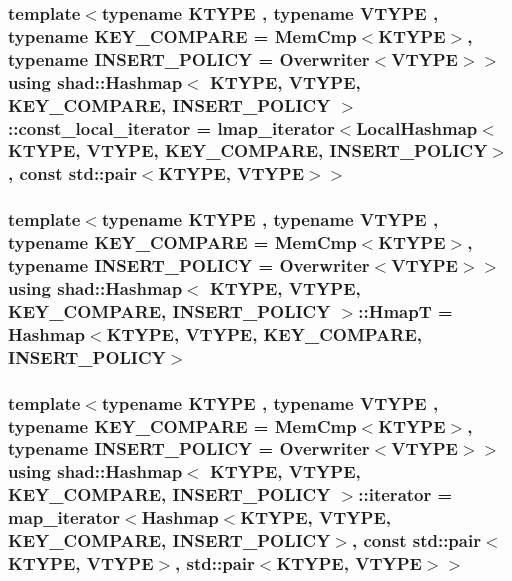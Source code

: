 \hypertarget{classshad_1_1Hashmap_afdf2dad495223a7d8bcec4256b591d89}{
\subsubsection[{const\-\_\-local\-\_\-iterator}]{\setlength{\rightskip}{0pt plus 5cm}template$<$typename K\-T\-Y\-P\-E , typename V\-T\-Y\-P\-E , typename K\-E\-Y\-\_\-\-C\-O\-M\-P\-A\-R\-E  = Mem\-Cmp$<$\-K\-T\-Y\-P\-E$>$, typename I\-N\-S\-E\-R\-T\-\_\-\-P\-O\-L\-I\-C\-Y  = Overwriter$<$\-V\-T\-Y\-P\-E$>$$>$ using {\bf shad\-::\-Hashmap}$<$ K\-T\-Y\-P\-E, V\-T\-Y\-P\-E, K\-E\-Y\-\_\-\-C\-O\-M\-P\-A\-R\-E, I\-N\-S\-E\-R\-T\-\_\-\-P\-O\-L\-I\-C\-Y $>$\-::{\bf const\-\_\-local\-\_\-iterator} =  {\bf lmap\-\_\-iterator}$<${\bf Local\-Hashmap}$<$K\-T\-Y\-P\-E, V\-T\-Y\-P\-E, K\-E\-Y\-\_\-\-C\-O\-M\-P\-A\-R\-E, I\-N\-S\-E\-R\-T\-\_\-\-P\-O\-L\-I\-C\-Y$>$, const std\-::pair$<$K\-T\-Y\-P\-E, V\-T\-Y\-P\-E$>$$>$}}\label{classshad_1_1Hashmap_afdf2dad495223a7d8bcec4256b591d89}
\hypertarget{classshad_1_1Hashmap_a8a56b050ace0e26454959cc45cdcb211}{
\subsubsection[{Hmap\-T}]{\setlength{\rightskip}{0pt plus 5cm}template$<$typename K\-T\-Y\-P\-E , typename V\-T\-Y\-P\-E , typename K\-E\-Y\-\_\-\-C\-O\-M\-P\-A\-R\-E  = Mem\-Cmp$<$\-K\-T\-Y\-P\-E$>$, typename I\-N\-S\-E\-R\-T\-\_\-\-P\-O\-L\-I\-C\-Y  = Overwriter$<$\-V\-T\-Y\-P\-E$>$$>$ using {\bf shad\-::\-Hashmap}$<$ K\-T\-Y\-P\-E, V\-T\-Y\-P\-E, K\-E\-Y\-\_\-\-C\-O\-M\-P\-A\-R\-E, I\-N\-S\-E\-R\-T\-\_\-\-P\-O\-L\-I\-C\-Y $>$\-::{\bf Hmap\-T} =  {\bf Hashmap}$<$K\-T\-Y\-P\-E, V\-T\-Y\-P\-E, K\-E\-Y\-\_\-\-C\-O\-M\-P\-A\-R\-E, I\-N\-S\-E\-R\-T\-\_\-\-P\-O\-L\-I\-C\-Y$>$}}\label{classshad_1_1Hashmap_a8a56b050ace0e26454959cc45cdcb211}
\hypertarget{classshad_1_1Hashmap_a2500b369fd011d6a9d5e98ff213c9c66}{
\subsubsection[{iterator}]{\setlength{\rightskip}{0pt plus 5cm}template$<$typename K\-T\-Y\-P\-E , typename V\-T\-Y\-P\-E , typename K\-E\-Y\-\_\-\-C\-O\-M\-P\-A\-R\-E  = Mem\-Cmp$<$\-K\-T\-Y\-P\-E$>$, typename I\-N\-S\-E\-R\-T\-\_\-\-P\-O\-L\-I\-C\-Y  = Overwriter$<$\-V\-T\-Y\-P\-E$>$$>$ using {\bf shad\-::\-Hashmap}$<$ K\-T\-Y\-P\-E, V\-T\-Y\-P\-E, K\-E\-Y\-\_\-\-C\-O\-M\-P\-A\-R\-E, I\-N\-S\-E\-R\-T\-\_\-\-P\-O\-L\-I\-C\-Y $>$\-::{\bf iterator} =  {\bf map\-\_\-iterator}$<${\bf Hashmap}$<$K\-T\-Y\-P\-E, V\-T\-Y\-P\-E, K\-E\-Y\-\_\-\-C\-O\-M\-P\-A\-R\-E, I\-N\-S\-E\-R\-T\-\_\-\-P\-O\-L\-I\-C\-Y$>$, const std\-::pair$<$K\-T\-Y\-P\-E, V\-T\-Y\-P\-E$>$, std\-::pair$<$K\-T\-Y\-P\-E, V\-T\-Y\-P\-E$>$$>$}}\label{classshad_1_1Hashmap_a2500b369fd011d6a9d5e98ff213c9c66}
